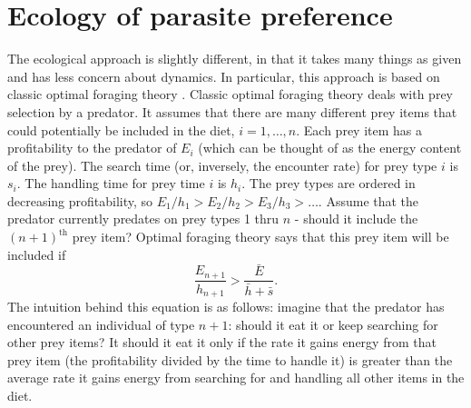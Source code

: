 \documentclass[11pt,reqno,final,pdftex]{amsart}\usepackage[]{graphicx}\usepackage[]{color}
\theoremstyle{plain}
\numberwithin{equation}{part}
\begin{document}
\section{Ecology of parasite preference}
The ecological approach is slightly different, in that it takes many things as given and has less concern about dynamics.
In particular, this approach is based on classic optimal foraging theory \citep{Charnov1976}.
Classic optimal foraging theory deals with prey selection by a predator.
It assumes that there are many different prey items that could potentially be included in the diet, $i = 1, \dots, n$.
Each prey item has a profitability to the predator of $E_i$ (which can be thought of as the energy content of the prey).
The search time (or, inversely, the encounter rate) for prey type $i$ is $s_i$.
The handling time for prey time $i$ is $h_i$.
The prey types are ordered in decreasing profitability, so $E_1/h_1 > E_2/h_2 > E_3/h_3 > \dots$.
Assume that the predator currently predates on prey types 1 thru $n$ - should it include the $(n+1)^{\text{th}}$ prey item?
Optimal foraging theory says that this prey item will be included if
\begin{equation}\label{eq:OFT}
\frac{E_{n+1}}{h_{n+1}} > \frac{\bar{E}}{\bar{h} + \bar{s}}.
\end{equation}
The intuition behind this equation is as follows: imagine that the predator has encountered an individual of type $n+1$: should it eat it or keep searching for other prey items?
It should it eat it only if the rate it gains energy from that prey item (the profitability divided by the time to handle it) is greater than the average rate it gains energy from searching for and handling all other items in the diet.
\end{document}
